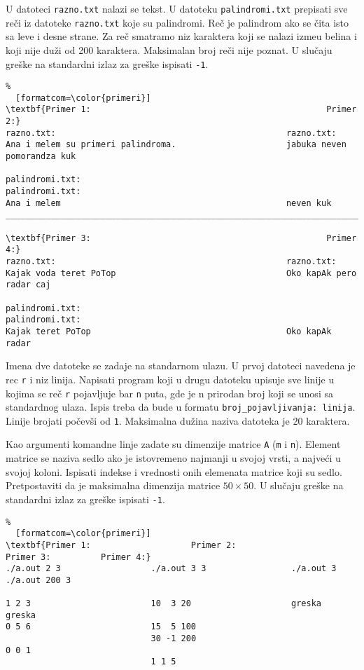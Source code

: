 \documentclass{article}
\def\d{{\fontencoding{T1}\selectfont\dj}}
\begin{document}
\begin{z}
U datoteci \verb|razno.txt| nalazi se tekst. U datoteku
\verb|palindromi.txt| prepisati sve re\v ci iz datoteke
\verb|razno.txt| koje su palindromi. Re\v c je palindrom ako se \v
cita isto sa leve i desne strane. Za re\v c smatramo niz karaktera
koji se nalazi izme\d u belina i koji nije du\v zi od 200
karaktera. Maksimalan broj re\v ci nije poznat. U slu\v caju gre\v ske
na standardni izlaz za greške ispisati {\tt -1}.
\end{z}
\begin{Verbatim}%
  [formatcom=\color{primeri}]
\textbf{Primer 1:                                               Primer 2:}
razno.txt:                                              razno.txt:
Ana i melem su primeri palindroma.                      jabuka neven pomorandza kuk

palindromi.txt:                                         palindromi.txt:
Ana i melem                                             neven kuk
______________________________________________________________________________________________________________

\textbf{Primer 3:                                               Primer 4:}
razno.txt:                                              razno.txt:
Kajak voda teret PoTop                                  Oko kapAk pero radar caj

palindromi.txt:                                         palindromi.txt:
Kajak teret PoTop                                       Oko kapAk radar
\end{Verbatim}

\begin{z}
   Imena dve datoteke se zadaje na standarnom ulazu.
   U prvoj datoteci 
   navedena je rec {\tt r} i niz linija. Napisati
   program koji u drugu datoteku  
   upisuje sve linije
   u kojima se re\v c {\tt r} pojavljuje bar {\tt n} puta, gde je
   n prirodan broj koji se unosi sa standardnog ulaza. Ispis
   treba da bude u formatu {\tt broj\_pojavljivanja: linija}. Linije brojati
   po\v cev\v si od {\tt 1}. Maksimalna du\v zina naziva datoteka je 20 karaktera.
\end{z}

\begin{z}
Kao argumenti komandne linje zadate su dimenzije matrice \verb|A|
(\verb|m| i \verb|n|).  Element matrice se naziva sedlo ako je
istovremeno najmanji u svojoj vrsti, a najve\'ci u svojoj
koloni. Ispisati indekse i vrednosti onih elemenata matrice koji su
sedlo. Pretpostaviti da je maksimalna dimenzija matrice $50\times 50$.
U slu\v caju gre\v ske na standardni izlaz za greške ispisati {\tt -1}.
\end{z}
\begin{Verbatim}%
  [formatcom=\color{primeri}]
\textbf{Primer 1:                    Primer 2:                   Primer 3:          Primer 4:}
./a.out 2 3                  ./a.out 3 3                 ./a.out 3          ./a.out 200 3

1 2 3                        10  3 20                    greska             greska
0 5 6                        15  5 100
                             30 -1 200
0 0 1
                             1 1 5
\end{Verbatim}
\end{document}
